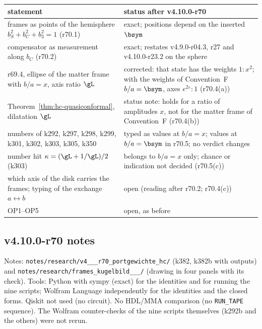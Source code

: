 \begin{center}
\small
\begin{tabular}{@{}>{\raggedright\arraybackslash}p{}>{\raggedright\arraybackslash}p{}@{}}
\toprule
statement & status after v4.10.0-r70\\
\midrule
frames as points of the hemisphere \(b_S^2+b_C^2+b_3^2=1\) (r70.1) & exact; positions depend on the inserted \(\bsym\)\\
compensator as measurement along \(b_C\) (r70.2) & exact; restates v4.9.0-r04.3, r27 and v4.10.0-r23.2 on the sphere\\
r69.4, ellipse of the matter frame with \(b/a=x\), axis ratio \(\gL\) & corrected: that state has the weights \(1:x^2\); with the weights of Convention~F \(b/a=\bsym\), axes \(e^{2\varepsilon}:1\) (r70.4(a))\\
Theorem~\ref{thm:hc-quasiconformal}, dilatation \(\gL\) & status note: holds for a ratio of amplitudes \(x\), not for the matter frame of Convention~F (r70.4(b))\\
numbers of k292, k297, k298, k299, k301, k302, k303, k305, k350 & typed as values at \(b/a=x\); values at \(b/a=\bsym\) in r70.5; no verdict changes\\
number hit \(\kappa=(\gL+1/\gL)/2\) (k303) & belongs to \(b/a=x\) only; chance or indication not decided (r70.5(c))\\
which axis of the disk carries the frames; typing of the exchange \(a\leftrightarrow b\) & open (reading after r70.2; r70.4(c))\\
OP1--OP5 & open, as before\\
\bottomrule
\end{tabular}
\end{center}

\subsection*{v4.10.0-r70 notes}
\label{subsec:v4100-r70-notes}

{\raggedright
Notes: \texttt{notes/\allowbreak research/\allowbreak v4\_\_\_\allowbreak r70\_\allowbreak portgewichte\_\allowbreak hc/}
(k382, k382b with outputs) and \texttt{notes/\allowbreak research/\allowbreak frames\_\allowbreak kugelbild\_\_\_/}
(drawing in four panels with its check).
Tools: Python with sympy (exact) for the identities and for running the nine scripts; Wolfram Language independently for the identities and
the closed forms.  Qiskit not used (no circuit).  No HDL/MMA comparison (no \texttt{RUN\_TAPE} sequence).  The Wolfram counter-checks of the nine
scripts themselves (k292b and the others) were not rerun.
\par}


